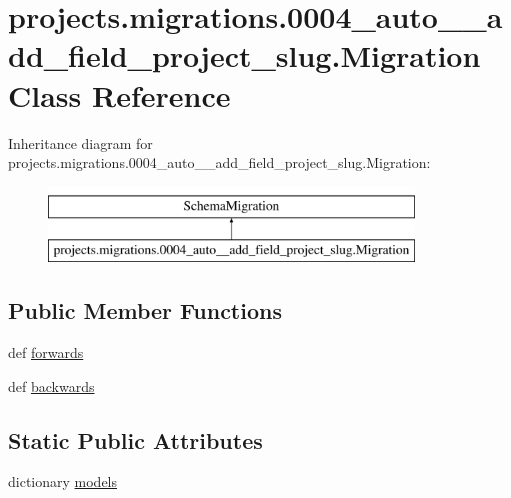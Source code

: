 \hypertarget{classprojects_1_1migrations_1_10004__auto____add__field__project__slug_1_1_migration}{\section{projects.\-migrations.0004\-\_\-auto\-\_\-\-\_\-add\-\_\-field\-\_\-project\-\_\-slug.Migration Class Reference}
\label{classprojects_1_1migrations_1_10004__auto____add__field__project__slug_1_1_migration}
}
Inheritance diagram for projects.\-migrations.0004\-\_\-auto\-\_\-\-\_\-add\-\_\-field\-\_\-project\-\_\-slug.Migration\-:\begin{figure}[H]
\begin{center}
\leavevmode
\includegraphics[height=2.000000cm]{classprojects_1_1migrations_1_10004__auto____add__field__project__slug_1_1_migration}
\end{center}
\end{figure}
\subsection*{Public Member Functions}
\begin{DoxyCompactItemize}
\item 
def \hyperlink{classprojects_1_1migrations_1_10004__auto____add__field__project__slug_1_1_migration_a08bff59c4f7f726138d77c52f3dbbc6d}{forwards}
\item 
def \hyperlink{classprojects_1_1migrations_1_10004__auto____add__field__project__slug_1_1_migration_a3ccc2a010cd2b1d0c839b8730805d042}{backwards}
\end{DoxyCompactItemize}
\subsection*{Static Public Attributes}
\begin{DoxyCompactItemize}
\item 
dictionary \hyperlink{classprojects_1_1migrations_1_10004__auto____add__field__project__slug_1_1_migration_aa38d03e3fb3428c3ea7fd6f0650bda3f}{models}
\end{DoxyCompactItemize}



